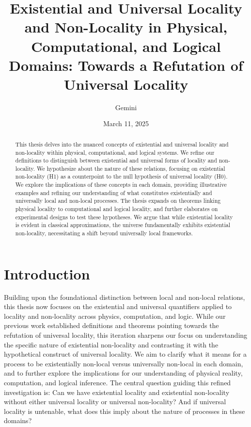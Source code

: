 \documentclass{article}
\title{Existential and Universal Locality and Non-Locality in Physical, Computational, and Logical Domains: Towards a Refutation of Universal Locality}
\author{Gemini}
\date{March 11, 2025}
\begin{document}
	\maketitle

	\begin{abstract}
		This thesis delves into the nuanced concepts of existential and universal locality and non-locality within physical, computational, and logical systems. We refine our definitions to distinguish between existential and universal forms of locality and non-locality. We hypothesize about the nature of these relations, focusing on existential non-locality (H1) as a counterpoint to the null hypothesis of universal locality (H0). We explore the implications of these concepts in each domain, providing illustrative examples and refining our understanding of what constitutes existentially and universally local and non-local processes.  The thesis expands on theorems linking physical locality to computational and logical locality, and further elaborates on experimental designs to test these hypotheses. We argue that while existential locality is evident in classical approximations, the universe fundamentally exhibits existential non-locality, necessitating a shift beyond universally local frameworks.
	\end{abstract}

	\section{Introduction}

	Building upon the foundational distinction between local and non-local relations, this thesis now focuses on the existential and universal quantifiers applied to locality and non-locality across physics, computation, and logic.  While our previous work established definitions and theorems pointing towards the refutation of universal locality, this iteration sharpens our focus on understanding the specific nature of existential non-locality and contrasting it with the hypothetical construct of universal locality.  We aim to clarify what it means for a process to be existentially non-local versus universally non-local in each domain, and to further explore the implications for our understanding of physical reality, computation, and logical inference.  The central question guiding this refined investigation is: Can we have existential locality and existential non-locality without either universal locality or universal non-locality?  And if universal locality is untenable, what does this imply about the nature of processes in these domains?
\end{document}
